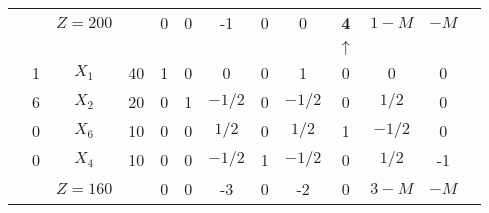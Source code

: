 \begin{tabular}{ccccccccccccc}
\cline{2-13}            &         & $Z=200$ &         & 0       & 0       & -1      & 0       & 0       & \textcolor[rgb]{ 0,  .439,  .753}{\textbf{4}} & $1-M$   & $-M$    &  \bigstrut\\
\cline{2-13}            &         &         &         &         &         &         &         &         & $\uparrow$ &         &         &  \bigstrut\\
\cline{2-13}            & 1       & $X_1$   & 40      & 1       & 0       & 0       & 0       & 1       & 0       & 0       & 0       &  \bigstrut[t]\\
            & 6       & $X_2$   & 20      & 0       & 1       & $-1/2$  & 0       & $-1/2$  & 0       & $1/2$   & 0       &  \\
            & 0       & $X_6$   & 10      & 0       & 0       & $1/2$   & 0       & $1/2$   & 1       & $-1/2$  & 0       &  \\
            & 0       & $X_4$   & 10      & 0       & 0       & $-1/2$  & 1       & $-1/2$  & 0       & $1/2$   & -1      &  \bigstrut[b]\\
\cline{2-12}            &         & $Z=160$ &         & 0       & 0       & -3      & 0       & -2      & 0       & $3-M$   & $-M$    &  \bigstrut\\
\cline{2-12}    \end{tabular}%
